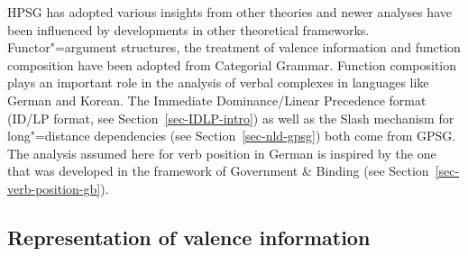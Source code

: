 HPSG has adopted various insights from other theories and newer analyses have been influenced by developments in other theoretical frameworks.
Functor"=argument structures, the treatment of valence information and function
composition have been adopted from
Categorial Grammar\indexcg. Function composition plays an important role in the analysis of verbal
complexes in languages like German and Korean. The Immediate Dominance/Linear Precedence format
(ID/LP format, see Section~\ref{sec-IDLP-intro}) as well as the Slash mechanism for long"=distance
dependencies (see Section~\ref{sec-nld-gpsg}) both come from GPSG\indexgpsg. The analysis assumed
here for verb position in German is inspired by the one that was developed in the framework of Government \& Binding\indexgb
(see Section~\ref{sec-verb-position-gb}).

\subsection{Representation of valence information}

